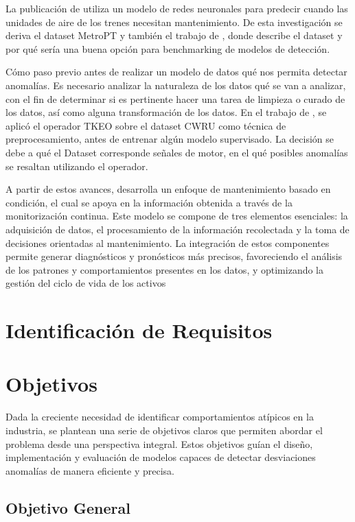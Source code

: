 \documentclass[11pt,a4paper,spanish]{book}
\numberwithin{equation}{chapter}
\numberwithin{figure}{chapter}
\begin{document}
La publicación de \cite{davari2021} utiliza un modelo de redes neuronales para predecir cuando las unidades de aire de los trenes necesitan mantenimiento. De esta investigación se deriva el dataset MetroPT y también el trabajo de  \cite{veloso2022metrpt}, donde describe el dataset y por qué sería una buena opción para benchmarking de modelos de detección.


Cómo paso previo antes de realizar un modelo de datos qué nos permita detectar anomalías. Es necesario analizar la naturaleza de los datos qué se van a analizar, con el fin de determinar si es pertinente hacer una tarea de limpieza o curado de los datos, así como alguna transformación de los datos. En el trabajo de \cite{yu2025tkeo}, se aplicó el operador TKEO sobre el dataset CWRU como técnica de preprocesamiento, antes de entrenar algún modelo supervisado. La decisión se debe a qué el Dataset corresponde  señales de motor, en el qué posibles anomalías se resaltan utilizando el operador.


A partir de estos avances, \cite{jardine2006review} desarrolla un enfoque de mantenimiento basado en condición, el cual se apoya en la información obtenida a través de la monitorización continua. Este modelo se compone de tres elementos esenciales: la adquisición de datos, el procesamiento de la información recolectada y la toma de decisiones orientadas al mantenimiento. La integración de estos componentes permite generar diagnósticos y pronósticos más precisos, favoreciendo el análisis de los patrones y comportamientos presentes en los datos, y optimizando la gestión del ciclo de vida de los activos \cite{jardine2006review}


\chapter{Identificación de Requisitos}


\chapter{Objetivos}

Dada la creciente necesidad de identificar comportamientos atípicos en la industria, 
se plantean una serie de objetivos claros que permiten abordar el problema desde una 
perspectiva integral. 
Estos objetivos guían el diseño, implementación y evaluación de modelos capaces de 
detectar desviaciones anomalías de manera eficiente y precisa.


\section{Objetivo General}
\end{document}
